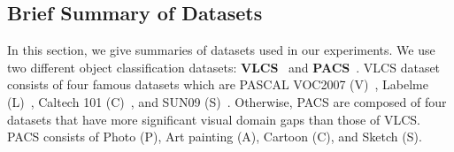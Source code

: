 \begin{table*}[t]
	\centering
	\vspace{-0.2cm}
	\caption{\small Cross-domain object classification results (accuracy. \%) on VLCS using AlexNet.}
	\label{tab:vlcs}
\end{table*}


\subsection{Brief Summary of Datasets}
In this section, we give summaries of datasets used in our experiments. We use two different object classification datasets: \textbf{VLCS}~\cite{chen2013vlcs} and \textbf{PACS}~\cite{Li2017dg}. VLCS dataset consists of four famous datasets which are PASCAL VOC2007 (V)~\cite{Everingham10}, Labelme (L)~\cite{labelme}, Caltech 101 (C)~\cite{Feifei2004caltech}, and SUN09 (S)~\cite{Choi2010sun09}. Otherwise, PACS are composed of four datasets that have more significant visual domain gaps than those of VLCS. PACS consists of Photo (P), Art painting (A), Cartoon (C), and Sketch (S).

